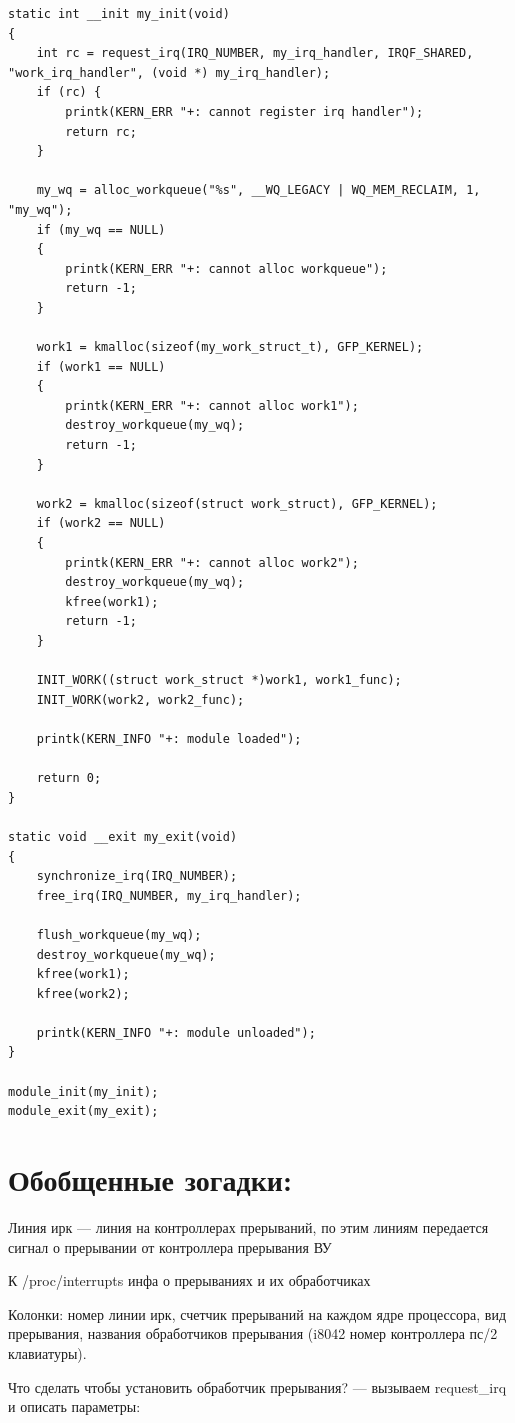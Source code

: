 \begin{lstlisting}
static int __init my_init(void)
{
    int rc = request_irq(IRQ_NUMBER, my_irq_handler, IRQF_SHARED, "work_irq_handler", (void *) my_irq_handler);
    if (rc) {
        printk(KERN_ERR "+: cannot register irq handler");
        return rc;
    }

    my_wq = alloc_workqueue("%s", __WQ_LEGACY | WQ_MEM_RECLAIM, 1, "my_wq");
    if (my_wq == NULL)
    {
        printk(KERN_ERR "+: cannot alloc workqueue");
        return -1;
    }

    work1 = kmalloc(sizeof(my_work_struct_t), GFP_KERNEL);
    if (work1 == NULL)
    {
        printk(KERN_ERR "+: cannot alloc work1");
        destroy_workqueue(my_wq);
        return -1;
    }

    work2 = kmalloc(sizeof(struct work_struct), GFP_KERNEL);
    if (work2 == NULL)
    {
        printk(KERN_ERR "+: cannot alloc work2");
        destroy_workqueue(my_wq);
        kfree(work1);
        return -1;
    }

    INIT_WORK((struct work_struct *)work1, work1_func);
    INIT_WORK(work2, work2_func);
    
    printk(KERN_INFO "+: module loaded");

    return 0;
}

static void __exit my_exit(void)
{
    synchronize_irq(IRQ_NUMBER);
    free_irq(IRQ_NUMBER, my_irq_handler);

    flush_workqueue(my_wq);
    destroy_workqueue(my_wq);
    kfree(work1);
    kfree(work2);
    
    printk(KERN_INFO "+: module unloaded");
}

module_init(my_init);
module_exit(my_exit);

\end{lstlisting}

\section*{Обобщенные зогадки:}

Линия ирк --- линия на контроллерах прерываний, по этим линиям передается сигнал о прерывании от контроллера прерывания ВУ

К /proc/interrupts инфа о прерываниях и их обработчиках

Колонки: номер линии ирк, счетчик прерываний на каждом ядре процессора, вид прерывания, названия обработчиков прерывания (i8042 номер контроллера пс/2 клавиатуры).

Что сделать чтобы установить обработчик прерывания? --- вызываем request\_irq и описать параметры: 

